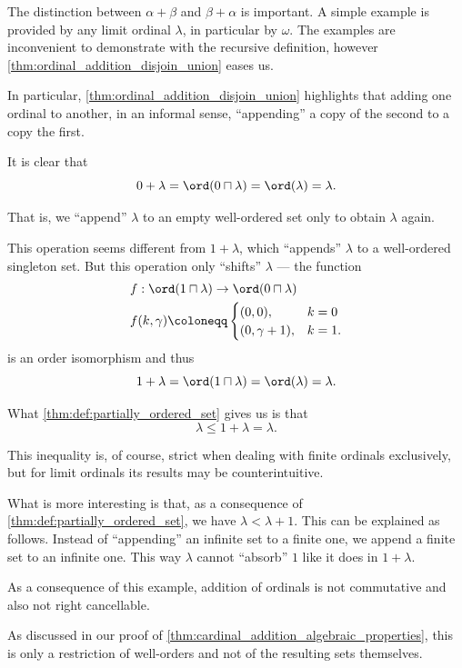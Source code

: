\begin{example}\label{ex:ordinal_addition}
  The distinction between \( \alpha + \beta \) and \( \beta + \alpha \) is important. A simple example is provided by any limit ordinal \( \lambda \), in particular by \( \omega \). The examples are inconvenient to demonstrate with the recursive definition, however \cref{thm:ordinal_addition_disjoin_union} eases us.

  In particular, \cref{thm:ordinal_addition_disjoin_union} highlights that adding one ordinal to another, in an informal sense, \enquote{appending} a copy of the second to a copy the first.

  It is clear that
  \begin{equation*}
    0 + \lambda = \ord(0 \sqcap \lambda) = \ord(\lambda) = \lambda.
  \end{equation*}

  That is, we \enquote{append} \( \lambda \) to an empty well-ordered set only to obtain \( \lambda \) again.

  This operation seems different from \( 1 + \lambda \), which \enquote{appends} \( \lambda \) to a well-ordered singleton set. But this operation only \enquote{shifts} \( \lambda \) --- the function
  \begin{equation*}
    \begin{aligned}
      &f: \ord(1 \sqcap \lambda) \to \ord(0 \sqcap \lambda) \\
      &f(k, \gamma) \coloneqq \begin{cases}
        (0, 0),          &k = 0 \\
        (0, \gamma + 1), &k = 1.
      \end{cases}
    \end{aligned}
  \end{equation*}
  is an order isomorphism and thus
  \begin{equation*}
    1 + \lambda = \ord(1 \sqcap \lambda) = \ord(\lambda) = \lambda.
  \end{equation*}

  What \cref{thm:def:partially_ordered_set} gives us is that
  \begin{equation*}
    \lambda \leq 1 + \lambda = \lambda.
  \end{equation*}

  This inequality is, of course, strict when dealing with finite ordinals exclusively, but for limit ordinals its results may be counterintuitive.

  What is more interesting is that, as a consequence of \cref{thm:def:partially_ordered_set}, we have \( \lambda < \lambda + 1 \). This can be explained as follows. Instead of \enquote{appending} an infinite set to a finite one, we append a finite set to an infinite one. This way \( \lambda \) cannot \enquote{absorb} \( 1 \) like it does in \( 1 + \lambda \).

  As a consequence of this example, addition of ordinals is not commutative and also not right cancellable.

  As discussed in our proof of \cref{thm:cardinal_addition_algebraic_properties}, this is only a restriction of well-orders and not of the resulting sets themselves.
\end{example}

